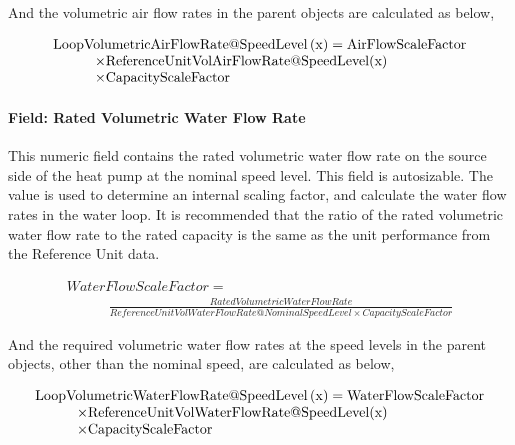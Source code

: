 And the volumetric air flow rates in the parent objects are calculated as below,

\begin{equation}
  \begin{array}{l}
    \rm{LoopVolumetricAirFlowRate} @ \rm{SpeedLevel} \left( x \right) = \rm{AirFlowScaleFactor} \\
    \quad \quad \quad \times \rm{ReferenceUnitVolAirFlowRate} @ \rm{SpeedLevel}(x) \\
    \quad \quad \quad \times \rm{CapacityScaleFactor}
  \end{array}
\end{equation}

\paragraph{Field: Rated Volumetric Water Flow Rate}\label{field-rated-volumetric-water-flow-rate}

This numeric field contains the rated volumetric water flow rate on the source side of the heat pump at the nominal speed level. This field is autosizable. The value is used to determine an internal scaling factor, and calculate the water flow rates in the water loop. It is recommended that the ratio of the rated volumetric water flow rate to the rated capacity is the same as the unit performance from the Reference Unit data.

\begin{equation}
  \begin{array}{l}
    WaterFlowScaleFactor = \\
    \quad \quad \quad \frac{{RatedVolumetricWaterFlowRate}}{{ReferenceUnitVolWaterFlowRate@NominalSpeedLevel \times CapacityScaleFactor}}
  \end{array}
\end{equation}

And the required volumetric water flow rates at the speed levels in the parent objects, other than the nominal speed, are calculated as below,

\begin{equation}
  \begin{array}{l}
    \rm{LoopVolumetricWaterFlowRate} @ \rm{SpeedLevel} \left( x \right) = \rm{WaterFlowScaleFactor} \\
    \quad \quad \quad \times \rm{ReferenceUnitVolWaterFlowRate} @ \rm{SpeedLevel}(x) \\
    \quad \quad \quad  \times \rm{CapacityScaleFactor}
  \end{array}
\end{equation}


